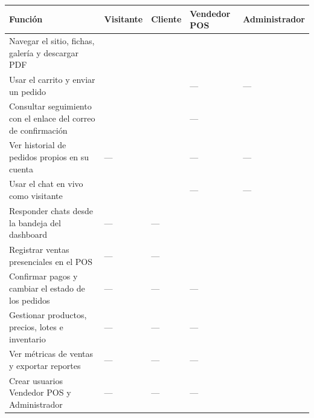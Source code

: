 \documentclass[11pt,letterpaper]{article}
\newcommand{\cmark}{\textcolor{mezcalAgave}{\ding{52}}}
\begin{document}
\renewcommand{\arraystretch}{1.3}
\begin{longtable}{@{} >{\raggedright\arraybackslash}p{6.0cm} >{\centering\arraybackslash}p{1.7cm} >{\centering\arraybackslash}p{1.6cm} >{\centering\arraybackslash}p{1.9cm} >{\centering\arraybackslash}p{2.6cm} @{}}
\toprule
\textbf{Función} & \textbf{Visitante} & \textbf{Cliente} & \textbf{Vendedor POS} & \textbf{Administrador} \\
\midrule
\endhead
\bottomrule
\endfoot
Navegar el sitio, fichas, galería y descargar PDF & \cmark & \cmark & \cmark & \cmark \\
Usar el carrito y enviar un pedido & \cmark & \cmark & --- & --- \\
Consultar seguimiento con el enlace del correo de confirmación & \cmark & \cmark & --- & \cmark \\
Ver historial de pedidos propios en su cuenta & --- & \cmark & --- & --- \\
Usar el chat en vivo como visitante & \cmark & \cmark & --- & --- \\
Responder chats desde la bandeja del dashboard & --- & --- & \cmark & \cmark \\
Registrar ventas presenciales en el POS & --- & --- & \cmark & \cmark \\
Confirmar pagos y cambiar el estado de los pedidos & --- & --- & --- & \cmark \\
Gestionar productos, precios, lotes e inventario & --- & --- & --- & \cmark \\
Ver métricas de ventas y exportar reportes & --- & --- & --- & \cmark \\
Crear usuarios Vendedor POS y Administrador & --- & --- & --- & \cmark \\
\end{longtable}
\end{document}
